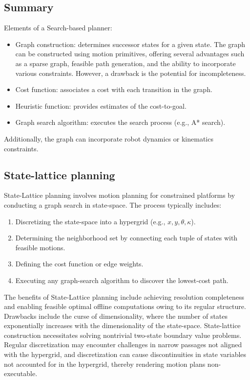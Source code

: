 \subsection{Summary}
Elements of a Search-based planner:
\begin{itemize}
    \item Graph construction: determines successor states for a given state.
        The graph can be constructed using motion primitives, offering several advantages such as a sparse graph, feasible path generation, and the ability to incorporate various constraints.
        However, a drawback is the potential for incompleteness.
    \item Cost function: associates a cost with each transition in the graph.
    \item Heuristic function: provides estimates of the cost-to-goal.
    \item Graph search algorithm: executes the search process (e.g., A* search).
\end{itemize}
Additionally, the graph can incorporate robot dynamics or kinematics constraints.

\subsection{State-lattice planning}
State-Lattice planning involves motion planning for constrained platforms by conducting a graph search in state-space. 
The process typically includes:
\begin{enumerate}
    \item Discretizing the state-space into a hypergrid (e.g., $x,y,\theta,\kappa$). 
    \item Determining the neighborhood set by connecting each tuple of states with feasible motions.
    \item Defining the cost function or edge weights.
    \item Executing any graph-search algorithm to discover the lowest-cost path.
\end{enumerate}
The benefits of State-Lattice planning include achieving resolution completeness and enabling feasible optimal offline computations owing to its regular structure.
Drawbacks include the curse of dimensionality, where the number of states exponentially increases with the dimensionality of the state-space. 
State-lattice construction necessitates solving nontrivial two-state boundary value problems.
Regular discretization may encounter challenges in narrow passages not aligned with the hypergrid, and discretization can cause discontinuities in state variables not accounted for in the hypergrid, thereby rendering motion plans non-executable.

